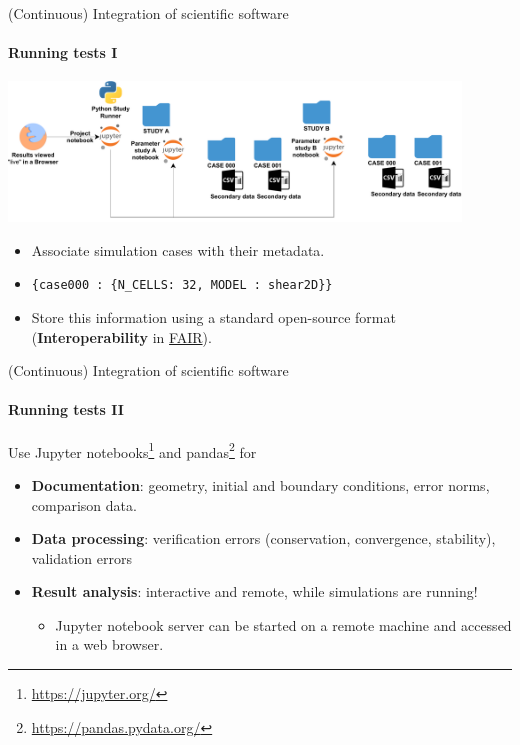 \begin{frame}{(Continuous) Integration of scientific software} 
\framesubtitle{Running tests I}
\vfill

\begin{center}
    \includegraphics[width=0.9\textwidth]{figures/Cluster-Parameter-Study-Organization.pdf}
\end{center}

    \begin{itemize}
        \item Associate simulation cases with their metadata. 
        \item \texttt{\{case000 : \{N\_CELLS: 32, MODEL : shear2D\}\}}
        \item Store this information using a standard open-source format (\textbf{Interoperability} in \href{https://www.go-fair.org/fair-principles/}{FAIR}).
    \end{itemize}

\end{frame}

\begin{frame}{(Continuous) Integration of scientific software} 
\framesubtitle{Running tests II}
\vfill

    Use Jupyter notebooks\footnote{\href{https://jupyter.org/}{https://jupyter.org/}} and pandas\footnote{\href{https://pandas.pydata.org/}{https://pandas.pydata.org/}} for 
    \begin{itemize}
        \item \textbf{Documentation}: geometry, initial and boundary conditions, error norms, comparison data.
        \item \textbf{Data processing}: verification errors (conservation, convergence, stability), validation errors 
        \item \textbf{Result analysis}: interactive and remote, while simulations are running!
            \begin{itemize}
                \item Jupyter notebook server can be started on a remote machine and accessed in a web browser.
            \end{itemize}
    \end{itemize}


\end{frame}

